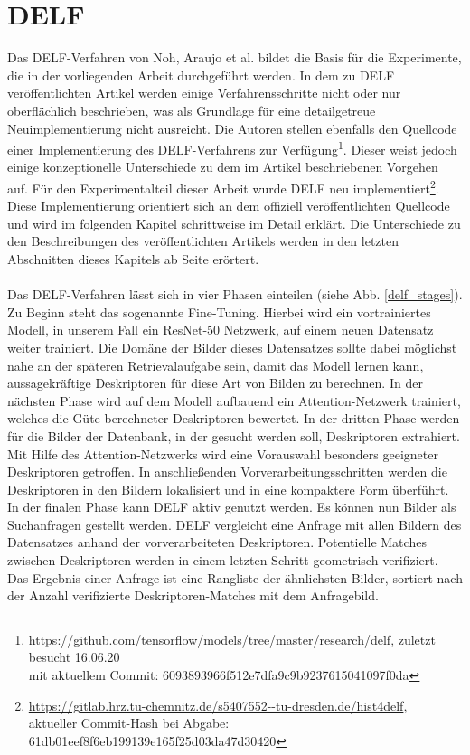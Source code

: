 \chapter{DELF}\label{delf_chapter}
Das DELF-Verfahren \cite{delf} von Noh, \mbox{Araujo} et al. bildet die Basis für die Experimente, die in der vorliegenden Arbeit durchgeführt werden.
In dem zu DELF veröffentlichten Artikel werden einige Verfahrensschritte nicht oder nur oberflächlich beschrieben, was als Grundlage für eine detailgetreue Neuimplementierung nicht ausreicht. Die Autoren stellen ebenfalls den Quellcode einer Implementierung des DELF-Verfahrens zur Verfügung\footnote{\url{https://github.com/tensorflow/models/tree/master/research/delf}, zuletzt besucht 16.06.20\\mit aktuellem Commit: 6093893966f512e7dfa9c9b9237615041097f0da}. Dieser weist jedoch einige konzeptionelle Unterschiede zu dem im Artikel beschriebenen Vorgehen auf. Für den Experimentalteil dieser Arbeit wurde DELF neu implementiert\footnote{\url{https://gitlab.hrz.tu-chemnitz.de/s5407552--tu-dresden.de/hist4delf},\\aktueller Commit-Hash bei Abgabe: 61db01eef8f6eb199139e165f25d03da47d30420}. Diese Implementierung orientiert sich an dem offiziell veröffentlichten Quellcode und wird im folgenden Kapitel schrittweise im Detail erklärt. Die Unterschiede zu den Beschreibungen des veröffentlichten Artikels werden in den letzten Abschnitten dieses Kapitels ab Seite \pageref{pipeline_changes} erörtert.  
\\\\
Das DELF-Verfahren lässt sich in vier Phasen einteilen (siehe Abb. \ref{delf_stages}). Zu Beginn steht das sogenannte Fine-Tuning. Hierbei wird ein vortrainiertes Modell, in unserem Fall ein ResNet-50 Netzwerk, auf einem neuen Datensatz weiter trainiert. Die Domäne der Bilder dieses Datensatzes sollte dabei möglichst nahe an der späteren Retrievalaufgabe sein, damit das Modell lernen kann, aussagekräftige Deskriptoren für diese Art von Bilden zu berechnen. In der nächsten Phase wird auf dem Modell aufbauend ein Attention-Netzwerk trainiert, welches die Güte berechneter Deskriptoren bewertet. In der dritten Phase werden für die Bilder der Datenbank, in der gesucht werden soll, Deskriptoren extrahiert. Mit Hilfe des Attention-Netzwerks wird eine Vorauswahl besonders geeigneter Deskriptoren getroffen. In anschließenden Vorverarbeitungsschritten werden die Deskriptoren in den Bildern lokalisiert und in eine kompaktere Form überführt. In der finalen Phase kann DELF aktiv genutzt werden. Es können nun Bilder als Suchanfragen gestellt werden. DELF vergleicht eine Anfrage mit allen Bildern des Datensatzes anhand der vorverarbeiteten Deskriptoren. Potentielle Matches zwischen Deskriptoren werden in einem letzten Schritt geometrisch verifiziert. Das Ergebnis einer Anfrage ist eine Rangliste der ähnlichsten Bilder, sortiert nach der Anzahl verifizierte Deskriptoren-Matches mit dem Anfragebild.
